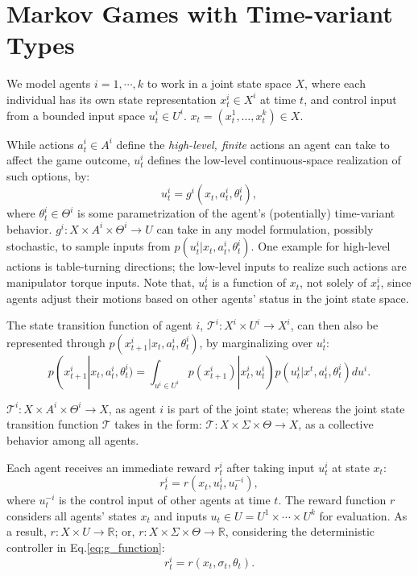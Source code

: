 \documentclass[letterpaper, 10 pt, conference]{ieeeconf}  %
\begin{document}
\section{Markov Games with Time-variant Types}
We model agents $i = 1,\cdots ,k$ to work in a joint state space $X$, where each individual has its own state 
representation $x_t^i \in X^i$ at time $t$, and control input from a bounded 
input space $u_t^i \in U^i$. $x_t = (x^1_t,\ldots,x^k_t) \in X$.

While actions $a_t^i \in A^i$ define the \textit{high-level, finite} actions an 
agent can take to affect the game outcome, $u_t^i$ defines the low-level continuous-space
realization of such options, by:
\begin{equation}\label{eq:g_function}
  u_t^i = g^i(x_t, a^i_t, \theta^i_t),
\end{equation}
where $\theta^i_t \in \Theta^i$ is some parametrization of the agent's 
(potentially) time-variant behavior.
$g^i:X \times A^i \times \Theta^i \rightarrow U$ can take in any model 
formulation, 
possibly stochastic, to sample inputs from $p(u_t^i|x_t,a^i_t,\theta_t^i)$. 
One example for high-level actions is table-turning directions; the low-level 
inputs to realize such actions are manipulator torque inputs. 
Note that, $u_t^i$ is a function of $x_t$, not solely of $x^i_t$, since agents 
adjust their motions based on other agents' status in the joint state space. 

The state transition function of agent $i$, 
$\mathcal{T}^i:X^i \times U^i \rightarrow X^i$, can then also be represented 
through
$p(x^i_{t+1}|x_t,a^i_t,\theta^i_t)$, by marginalizing over $u^i_t$:
\begin{equation}
  p(x^i_{t+1}|x_t,a^i_t,\theta^i_t) = \int_{u^i \in U^i} 
  p(x_{t+1}^i)|x^i_t,u^i_t) p(u^i_t|x^t,a^i_t,\theta^i_t)du^i.
\end{equation}

$\mathcal{T}^i:X \times A^i \times \Theta^i \rightarrow X$, as agent $i$ is 
part of the joint state; whereas the joint 
state transition function $\mathcal{T}$ takes in the form: 
$\mathcal{T}:X \times \Sigma \times \Theta \rightarrow X$, as a collective 
behavior among all agents. 

Each agent receives an immediate reward $r^i_t$ 
after taking input $u_t^i$ at state $x_t$:
\begin{equation}\label{eq:r_control_input}
  r^i_t = r(x_t,u^i_t,u^{-i}_t),
\end{equation}
where $u^{-i}_t$ is the control input of other agents at time $t$. The reward 
function $r$ considers all agents' states $x_t$ and inputs 
$u_t \in U = U^1\times \cdots \times U^k$ for evaluation.
As a result, $r: X \times U \rightarrow \mathbb{R}$; or, 
$r: X\times \Sigma \times \Theta \rightarrow \mathbb{R}$, considering the 
deterministic controller in Eq.\ref{eq:g_function}:
\begin{equation}\label{eq:r_function}
  r^i_t = r(x_t,\sigma_t,\theta_t).
\end{equation}
\end{document}
